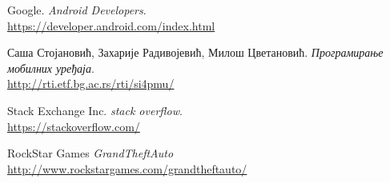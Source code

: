 


\begin{thebibliography}{refs}
		Google.
		\emph{Android Developers}.\\
		\url{https://developer.android.com/index.html}
		
		Саша Стојановић, Захарије Радивојевић, Милош Цветановић.
		\emph{Програмирање мобилних уређаја}.\\
		\url{http://rti.etf.bg.ac.rs/rti/si4pmu/}
		
		Stack Exchange Inc.
		\emph{stack overflow}.\\
		\url{https://stackoverflow.com/}
		
		RockStar Games 
		\emph{GrandTheftAuto}
		\url{http://www.rockstargames.com/grandtheftauto/}
		


\end{thebibliography}